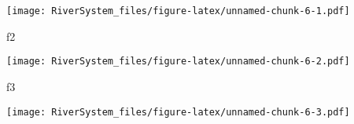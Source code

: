 \documentclass[
]{article}
\newenvironment{Shaded}{\begin{snugshade}}{\end{snugshade}}
\newcommand{\NormalTok}[1]{#1}
\begin{document}
\texttt{[image: RiverSystem\_files/figure-latex/unnamed-chunk-6-1.pdf]}

\begin{Shaded}
\begin{Highlighting}[]
\NormalTok{f2}
\end{Highlighting}
\end{Shaded}

\texttt{[image: RiverSystem\_files/figure-latex/unnamed-chunk-6-2.pdf]}

\begin{Shaded}
\begin{Highlighting}[]
\NormalTok{f3}
\end{Highlighting}
\end{Shaded}

\texttt{[image: RiverSystem\_files/figure-latex/unnamed-chunk-6-3.pdf]}
\end{document}
